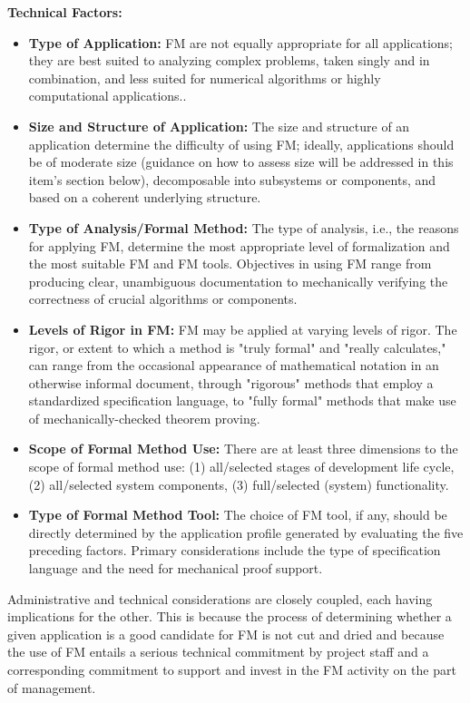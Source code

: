 \documentclass{template/openetcs_report}
\begin{document}
\textbf{Technical Factors:}
\begin{itemize}\itemsep=0pt
  \item \textbf{Type of Application:} FM are not equally appropriate for all applications; they are best suited to analyzing complex problems, taken singly and in combination, and less suited for numerical algorithms or highly computational applications..
  \item \textbf{Size and Structure of Application:} The size and structure of an application determine the difficulty of using FM; ideally, applications should be of moderate size (guidance on how to assess size will be addressed in this item's section below), decomposable into subsystems or components, and based on a coherent underlying structure.
  \item \textbf{Type of Analysis/Formal Method:} The type of analysis, i.e., the reasons for applying FM, determine the most appropriate level of formalization and the most suitable FM and FM tools. Objectives in using FM range from producing clear, unambiguous documentation to mechanically verifying the correctness of crucial algorithms or components.
  \item \textbf{Levels of Rigor in FM:} FM may be applied at varying levels of rigor. The rigor, or extent to which a method is "truly formal" and "really calculates," can range from the occasional appearance of mathematical notation in an otherwise informal document, through "rigorous" methods that employ a standardized specification language, to "fully formal" methods that make use of mechanically-checked theorem proving.
  \item \textbf{Scope of Formal Method Use:} There are at least three dimensions to the scope of formal method use: (1) all/selected stages of development life cycle, (2) all/selected system components, (3) full/selected (system) functionality.
  \item \textbf{Type of Formal Method Tool:} The choice of FM tool, if any, should be directly determined by the application profile generated by evaluating the five preceding factors. Primary considerations include the type of specification language and the need for mechanical proof support.
\end{itemize}

Administrative and technical considerations are closely coupled, each having implications for the other. This is because the process of determining whether a given application is a good candidate for FM is not cut and dried and because the use of FM entails a serious technical commitment by project staff and a corresponding commitment to support and invest in the FM activity on the part of management. 
\end{document}
